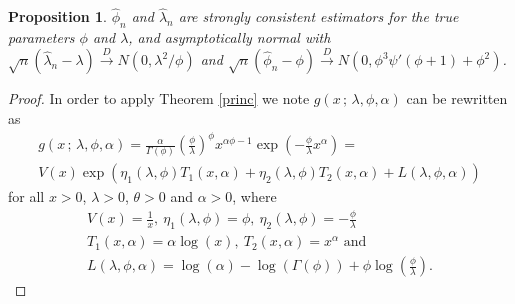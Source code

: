 \documentclass[10pt,a4paper,onecolumn]{article} %
\newtheorem{proposition}[theorem]{Proposition}
\begin{document}
\begin{proposition}\label{proofgamma} $\hat\phi_n$ and $\hat\lambda_n$ are strongly consistent estimators for the true parameters $\phi$ and $\lambda$, and asymptotically normal with $\sqrt{n}\left(\hat{\lambda}_n-\lambda\right)\overset{D}{\to} N\left(0,\lambda^2/\phi\right)$ and $\sqrt{n}\left(\hat{\phi}_n-\phi\right)\overset{D}{\to} N\left(0,\phi^3\psi'(\phi+1)+\phi^2\right)$.
\end{proposition}
\begin{proof}In order to apply Theorem \ref{princ}
 we note $g(x\,;\,\lambda,\phi,\alpha)$ can be rewritten as
 \begin{equation*}
 \begin{aligned}
 g(x\,;\,\lambda,\phi,\alpha)=\frac{\alpha}{\Gamma(\phi)}\left(\frac{\phi}{\lambda} \right)^\phi x^{\alpha\phi-1}\exp\left(-\frac{\phi}{\lambda} x^\alpha \right)=\\
 V(x)\exp\left(\eta_1(\lambda,\phi)T_1(x,\alpha)+\eta_2(\lambda,\phi)T_2(x,\alpha)+L(\lambda,\phi,\alpha)\right)
 \end{aligned}
 \end{equation*}
for all $x>0$, $\lambda>0$, $\theta>0$ and $\alpha>0$, where
\begin{equation*}
\begin{aligned}V(x)=\frac{1}{x},\ \eta_1(\lambda,\phi)=\phi,\ \eta_2(\lambda,\phi)=-\frac{\phi}{\lambda}\\
T_1(x,\alpha)=\alpha\log(x),\ T_2(x,\alpha) = x^{\alpha}\mbox{ and }\\
L(\lambda,\phi,\alpha)=\log\left(\alpha\right)-\log\left(\Gamma(\phi)\right)+\phi\log\left(\frac{\phi}{\lambda}\right).
\end{aligned}
\end{equation*}


\end{proof}
\end{document}
